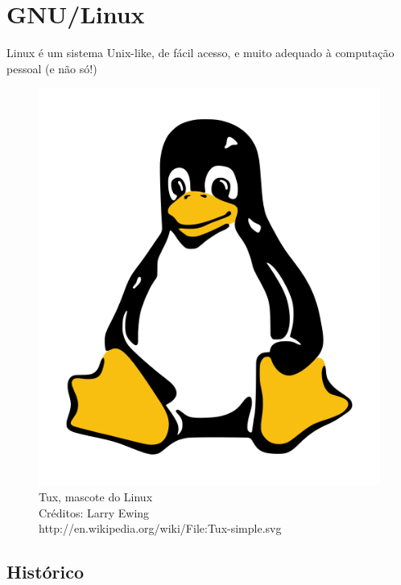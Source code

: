 \documentclass{beamer}
\begin{document}
\section{GNU/Linux}

\begin{frame}
  Linux é um sistema Unix-like, de fácil acesso, e muito adequado à
  computação pessoal (e não só!)

  \begin{figure}
    \includegraphics[scale=0.2]{images/tux.png}
    \footnotesize{
    \\Tux, mascote do Linux
    \\Créditos: Larry Ewing
    \\http://en.wikipedia.org/wiki/File:Tux-simple.svg
    }
  \end{figure}
\end{frame}

\subsection{Histórico}
\end{document}
